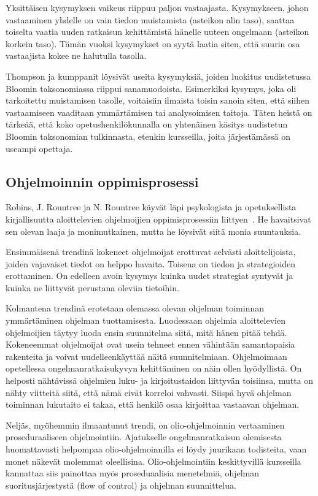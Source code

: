 \documentclass[finnish]{../tktltiki2}
\theoremstyle{definition}
\theoremstyle{remark}
\begin{document}
Yksittäisen kysymyksen vaikeus riippuu paljon vastaajasta. Kysymykseen, johon vastaaminen yhdelle on vain tiedon muistamista (asteikon alin taso), saattaa toiselta vaatia uuden ratkaisun kehittämistä hänelle uuteen ongelmaan (asteikon korkein taso). Tämän vuoksi kysymykset on syytä laatia siten, että suurin osa vastaajista kokee ne halutulla tasolla.

Thompson ja kumppanit löysivät useita kysymyksiä, joiden luokitus uudistetussa Bloomin taksonomiassa riippui sanamuodoista. Esimerkiksi kysymys, joka oli tarkoitettu muistamisen tasolle, voitaisiin ilmaista toisin sanoin siten, että siihen vastaamiseen vaaditaan ymmärtämisen tai analysoimisen taitoja. Täten heistä on tärkeää, että koko opetushenkilökunnalla on yhtenäinen käsitys uudistetun Bloomin taksonomian tulkinnasta, etenkin kursseilla, joita järjestämässä on useampi opettaja.

\subsection{Ohjelmoinnin oppimisprosessi}

Robins, J. Rountree ja N. Rountree käyvät läpi psykologista ja opetuksellista kirjallisuutta aloittelevien ohjelmoijien oppimisprosessiin liittyen~\cite{RRR03}. He havaitsivat sen olevan laaja ja monimutkainen, mutta he löysivät siitä monia suuntauksia.

Ensimmäisenä trendinä kokeneet ohjelmoijat erottuvat selvästi aloittelijoista, joiden vajavaiset tiedot on helppo havaita. Toisena on tiedon ja strategioiden erottaminen. On edelleen avoin kysymys kuinka uudet strategiat syntyvät ja kuinka ne liittyvät perustana oleviin tietoihin.

Kolmantena trendinä erotetaan olemassa olevan ohjelman toiminnan ymmärtäminen ohjelman tuottamisesta. Luodessaan ohjelmia aloittelevien ohjelmoijien täytyy luoda ensin suunnitelma siitä, mitä hänen pitää tehdä. Kokeneemmat ohjelmoijat ovat usein tehneet ennen vähintään samantapaisia rakenteita ja voivat uudelleenkäyttää näitä suunnitelmiaan. Ohjelmoimaan opetellessa ongelmanratkaisukyvyn kehittäminen on näin ollen hyödyllistä. On helposti nähtävissä ohjelmien luku- ja kirjoitustaidon liittyvän toisiinsa, mutta on nähty viitteitä siitä, että nämä eivät korreloi vahvasti. Siispä hyvä ohjelman toiminnan lukutaito ei takaa, että henkilö osaa kirjoittaa vastaavan ohjelman.

Neljäs, myöhemmin ilmaantunut trendi, on olio-ohjelmoinnin vertaaminen proseduraaliseen ohjelmointiin. Ajatukselle ongelmanratkaisun olemisesta huomattavasti helpompaa olio-ohjelmoinnilla ei löydy juurikaan todisteita, vaan monet näkevät molemmat oleellisina. Olio-ohjelmointiin keskittyvillä kursseilla kannattaa siis painottaa myös proseduaalisia menetelmiä, ohjelman suoritusjärjestystä (flow of control) ja ohjelman suunnittelua.
\end{document}

